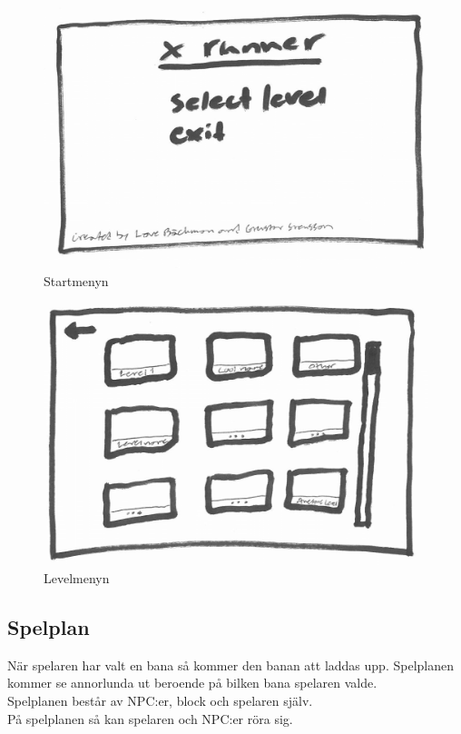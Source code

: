 \documentclass{TDP003mall}
\begin{document}
\begin{figure}[h]
  \centering
  \includegraphics[scale=0.15]{startmeny}
  \caption{Startmenyn}
  \label{Startmenyn}
\end{figure}

\begin{figure}[h]
  \centering
  \includegraphics[scale=0.15]{levelmeny}
  \caption{Levelmenyn}
  \label{Levelmenyn}
\end{figure}

\newpage
\subsection{Spelplan}
När spelaren har valt en bana så kommer den banan att laddas upp. Spelplanen kommer se annorlunda ut beroende på bilken bana spelaren valde. \\
Spelplanen består av NPC:er, block och spelaren själv. \\
På spelplanen så kan spelaren och NPC:er röra sig.
\end{document}
